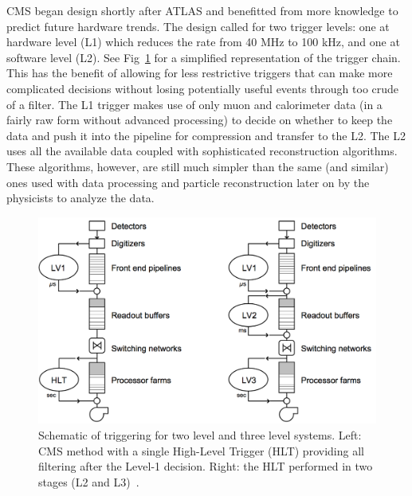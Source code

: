 	CMS began design shortly after ATLAS and benefitted from more knowledge to predict future hardware trends. The design called for two trigger levels: one at hardware level (L1) which reduces the rate from 40 MHz to 100 kHz, and one at software level (L2). See Fig~\ref{fig:trigger_chain} for a simplified representation of the trigger chain. This has the benefit of allowing for less restrictive triggers that can make more complicated decisions without losing potentially useful events through too crude of a filter. The L1 trigger makes use of only muon and calorimeter data (in a fairly raw form without advanced processing) to decide on whether to keep the data and push it into the pipeline for compression and transfer to the L2. The L2 uses all the available data coupled with sophisticated reconstruction algorithms. These algorithms, however, are still much simpler than the same (and similar) ones used with data processing and particle reconstruction later on by the physicists to analyze the data.\\
	\begin{figure}[h]
\begin{center}
\includegraphics[width=0.9\linewidth]{Figs/2level_3level_trigger.png}
\caption{\label{fig:trigger_chain}
Schematic of triggering for two level and three level systems. Left: CMS method with a single High-Level Trigger (HLT) providing all filtering after the Level-1 decision. Right: the HLT performed in two stages (L2 and
L3)~\cite{triggertdr1}.
}
\end{center}
\end{figure}

